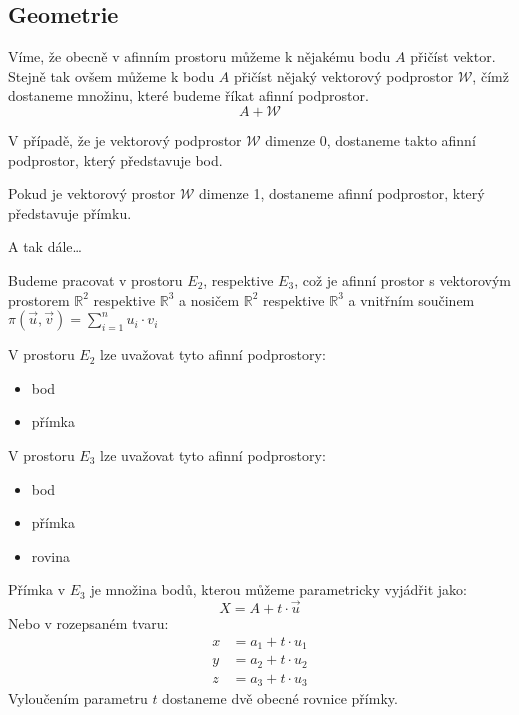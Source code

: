 \subsection{Geometrie}
\begin{definition}
    Víme, že obecně v afinním prostoru můžeme k nějakému bodu $A$ přičíst vektor.
    Stejně tak ovšem můžeme k bodu $A$ přičíst nějaký vektorový podprostor $\mathcal{W}$,
    čímž dostaneme množinu, které budeme říkat afinní podprostor.
    $$A + \mathcal{W}$$

    V případě, že je vektorový podprostor $\mathcal{W}$ dimenze 0, dostaneme takto afinní
    podprostor, který představuje bod.

    Pokud je vektorový prostor $\mathcal{W}$ dimenze 1, dostaneme afinní podprostor,
    který představuje přímku.

    A tak dále\ldots
\end{definition}

Budeme pracovat v prostoru $E_2$, respektive $E_3$, což je afinní prostor
s vektorovým prostorem $\mathbb{R}^2$ respektive $\mathbb{R}^3$ a nosičem
$\mathbb{R}^2$ respektive $\mathbb{R}^3$ a vnitřním součinem
$\pi(\vec{u}, \vec{v}) = \sum_{i=1}^n u_i \cdot v_i$

V prostoru $E_2$ lze uvažovat tyto afinní podprostory:
\begin{itemize}
    \item bod
    \item přímka
\end{itemize}

V prostoru $E_3$ lze uvažovat tyto afinní podprostory:
\begin{itemize}
    \item bod
    \item přímka
    \item rovina
\end{itemize}

\begin{definition}[Přímka v $E_3$]
    Přímka v $E_3$ je množina bodů, kterou můžeme parametricky vyjádřit jako:
    $$X = A + t\cdot \vec{u}$$
    Nebo v rozepsaném tvaru:
    \begin{align*}
        x &= a_1 + t \cdot u_1\\
        y &= a_2 + t \cdot u_2\\
        z &= a_3 + t \cdot u_3
    \end{align*}
    Vyloučením parametru $t$ dostaneme dvě obecné rovnice přímky.
\end{definition}

